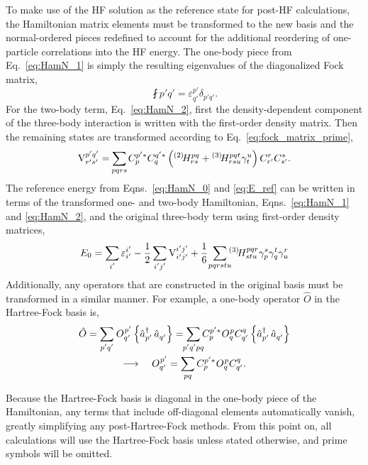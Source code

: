 \documentclass[thesis.tex]{subfiles}
\begin{document}
To make use of the HF solution as the reference state for post-HF calculations, the Hamiltonian matrix elements must be transformed to the new basis and the normal-ordered pieces redefined to account for the additional reordering of one-particle correlations into the HF energy.  The one-body piece from Eq.\ \eqref{eq:HamN_1} is simply the resulting eigenvalues of the diagonalized Fock matrix,
\begin{equation} \label{eq:HF_Ham_1}
  \fint{p'}{q'} = \varepsilon^{p'}_{q'}\delta_{p'q'}.
\end{equation}
For the two-body term, Eq.\ \eqref{eq:HamN_2}, first the density-dependent component of the three-body interaction is written with the first-order density matrix.  Then the remaining states are transformed according to Eq.\ \eqref{eq:fock_matrix_prime},
\begin{equation} \label{eq:HF_Ham_2}
  \vint{p'q'}{r's'} = \sum_{\mathclap{pqrs}} C^{p'*}_{p}C^{q'*}_{q}\left(\Hint{2}{pq}{rs} + \Hint{3}{pqt}{rsu}\gamma^{u}_{t}\right)C^{r}_{r'}C^{s}_{s'}.
\end{equation}
The reference energy from Eqns.\ \eqref{eq:HamN_0} and \eqref{eq:E_ref} can be written in terms of the transformed one- and two-body Hamiltonian, Eqns.\ \eqref{eq:HamN_1} and \eqref{eq:HamN_2}, and the original three-body term using first-order density matrices,
\begin{equation} \label{eq:EF_Ham_0}
  E_{0} = \sum_{\mathclap{i'}}\varepsilon^{i'}_{i'} - \frac{1}{2}\sum_{\mathclap{i'j'}}\vint{i'j'}{i'j'} + \frac{1}{6}\ \sum_{\mathclap{pqrstu}}\Hint{3}{pqr}{stu}\gamma^{s}_{p}\gamma^{t}_{q}\gamma^{r}_{u}
\end{equation}
Additionally, any operators that are constructed in the original basis must be transformed in a similar manner.  For example, a one-body operator $\hat{O}$ in the Hartree-Fock basis is,
\begin{gather}
  \hat{O} = \sum_{\mathclap{p'q'}}\opint{}{p'}{q'}\normord{\co{p'}\ao{q'}} = \sum_{\mathclap{p'q'pq}}C^{p'*}_{p}\opint{}{p}{q}C^{q}_{q'}\normord{\co{p'}\ao{q'}} \notag \\
  \longrightarrow\ \ \ \opint{}{p'}{q'} = \sum_{\mathclap{pq}}C^{p'*}_{p}\opint{}{p}{q}C^{q}_{q'}.
\end{gather}

Because the Hartree-Fock basis is diagonal in the one-body piece of the Hamiltonian, any terms that include off-diagonal elements automatically vanish, greatly simplifying any post-Hartree-Fock methods.  From this point on, all calculations will use the Hartree-Fock basis unless stated otherwise, and prime symbols will be omitted.
\end{document}
